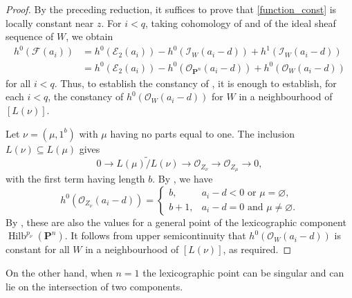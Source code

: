\documentclass[leqno,11pt,a4paper]{amsart}
\theoremstyle{definition}
\numberwithin{equation}{section}
\newcommand{\PP}{\mathbf{P}}
\newcommand{\EE}{\mathscr{E}}
\newcommand{\FF}{\mathscr{F}}
\newcommand{\OO}{\mathscr{O}}
\newcommand{\II}{\mathscr{I}}
\DeclareMathOperator{\Hilb}{Hilb}
\begin{document}
\begin{proof}
By the preceding reduction, it suffices to prove that \eqref{function_const} is locally constant near $z$.
For $i<q$, taking cohomology of  and of the ideal sheaf sequence of $W$,
we obtain
\begin{align*}
h^0(\FF(a_i)) &= h^0(\EE_2(a_i)) - h^0(\II_W(a_i-d)) + h^1(\II_W(a_i-d)) \\
& = h^0(\EE_2(a_i)) -h^0(\OO_{\PP^n}(a_i-d)) +h^0(\OO_W(a_i-d))
\end{align*}
for all $i < q$.
Thus, to establish the constancy of , it is enough to establish, for each $i < q$, the constancy of $h^0(\OO_W(a_i-d))$ for $W$ in a neighbourhood of $[L(\nu)]$.


Let $\nu=(\mu,1^b)$ with $\mu$ having no parts equal to one.
The inclusion $L(\nu)\subseteq L(\mu)$ gives
$$
0\longrightarrow\widetilde{L(\mu)/L(\nu)} \longrightarrow\OO_{Z_\nu}\longrightarrow\OO_{Z_\mu} \longrightarrow 0,
$$
with the first term having length $b$. 
By , we have
$$
h^0(\OO_{Z_\nu}(a_i-d))=
\begin{cases}
b, & a_i-d <0 \text{ or } \mu = \varnothing,\\
b+1, & a_i-d =0 \text{ and } \mu \ne \varnothing.
\end{cases}
$$
By , these are also the values for a general point of the lexicographic component $\Hilb^{p_\nu}(\PP^n)$. 
It follows from upper semicontinuity that $h^0(\OO_W(a_i-d))$ is constant for all $W$ in a neighbourhood of $[L(\nu)]$, as required.
\end{proof}

On the other hand, when $n=1$ the lexicographic point can be singular and can lie on the intersection of two components.
\end{document}
